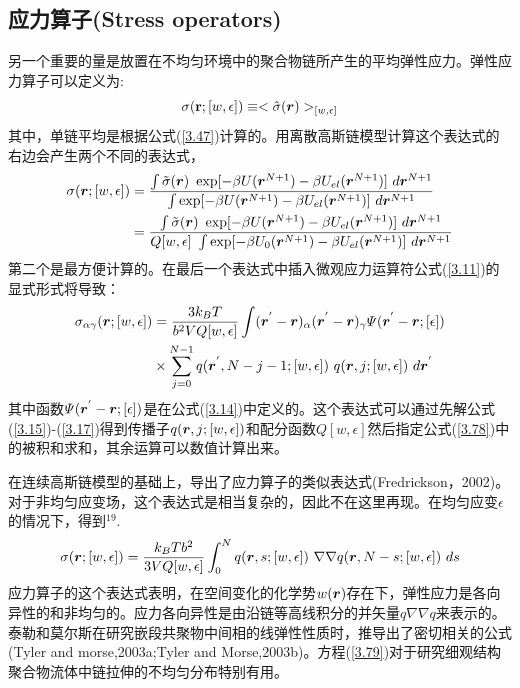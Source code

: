 \subsection{应力算子(Stress operators)}
另一个重要的量是放置在不均匀环境中的聚合物链所产生的平均弹性应力。弹性应力算子可以定义为:
\begin{equation}\label{3.76}
\sigma(\mathbf{\bm{r}};[w,\epsilon])\equiv<\hat{\sigma}(\bm{r})>_{[w,\epsilon]}
\end{equation}
其中，单链平均是根据公式(\ref{3.47})计算的。用离散高斯链模型计算这个表达式的右边会产生两个不同的表达式，
\begin{equation}\label{3.77}
\begin{aligned}
\sigma(\bm{r};[w,\epsilon])&=\frac{\int {\tilde{\sigma}}(\bm{r})~\exp[-\beta U(\bm{r}^{N+1})-\beta U_{el}(\bm{r}^{N+1})]~d\bm{r}^{N+1}}{\int \exp[-\beta U(\bm{r}^{N+1})-\beta U_{el}(\bm{r}^{N+1})]~d\bm{r}^{N+1}}\\&=\frac{\int \tilde{\sigma}(\bm{r})~\exp[-\beta U(\bm{r}^{N+1})-\beta U_{el}(\bm{r}^{N+1})]~d\bm{r}^{N+1}}{Q[w,\epsilon]~\int \exp[-\beta U_0(\bm{r}^{N+1})-\beta U_{el}(\bm{r}^{N+1})]~d\bm{r}^{N+1}}
\end{aligned}
\end{equation}
第二个是最方便计算的。在最后一个表达式中插入微观应力运算符公式(\ref{3.11})的显式形式将导致：
\begin{equation}
\begin{aligned}\label{3.78}
\sigma_{\alpha \gamma}(\bm{r};[w,\epsilon])&=\frac{3k_BT}{b^2VQ[w,\epsilon]} \int (\bm{r}^{'}-\bm{r})_{\alpha} (\bm{r}^{'}-\bm{r})_{\gamma} \varPsi (\bm{r}^{'}-\bm{r};[\epsilon])\\&\times \sum_{j=0}^{N-1}q(\bm{r}^{'},N-j-1;[w,\epsilon])~q(\bm{r},j;[w,\epsilon])~d\bm{r}^{'}
\end{aligned}
\end{equation}
其中函数$\varPsi (\bm{r}^{'}-\bm{r};[\epsilon])$是在公式(\ref{3.14})中定义的。这个表达式可以通过先解公式(\ref{3.15})-(\ref{3.17})得到传播子$q(\bm{r},j;[w,\epsilon])$和配分函数$Q[w,\epsilon]$然后指定公式(\ref{3.78})中的被积和求和，其余运算可以数值计算出来。

在连续高斯链模型的基础上，导出了应力算子的类似表达式(Fredrickson，2002)。对于非均匀应变场，这个表达式是相当复杂的，因此不在这里再现。在均匀应变$\epsilon$的情况下，得到$^{19}$.
\begin{equation}\label{3.79}
\sigma(\bm{r};[w,\epsilon])=\frac{k_BTb^2}{3VQ[w,\epsilon]}\int_{0}^{N} q(\bm{r},s;[w,\epsilon])~\nabla \nabla q(\bm{r},N-s;[w,\epsilon])~ds
\end{equation}
应力算子的这个表达式表明，在空间变化的化学势$w(\bm{r})$存在下，弹性应力是各向异性的和非均匀的。应力各向异性是由沿链等高线积分的并矢量$q\nabla \nabla q$来表示的。泰勒和莫尔斯在研究嵌段共聚物中间相的线弹性性质时，推导出了密切相关的公式(Tyler and morse,2003a;Tyler and Morse,2003b)。方程(\ref{3.79})对于研究细观结构聚合物流体中链拉伸的不均匀分布特别有用。
